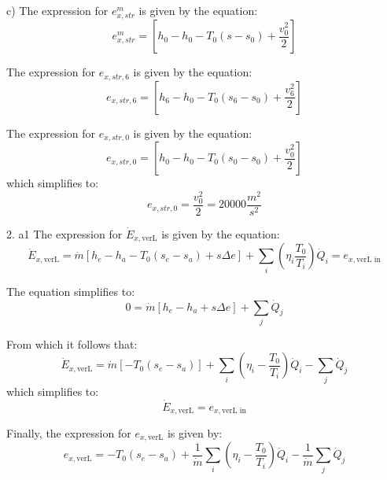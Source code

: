 c)
The expression for \( e_{x,str}^m \) is given by the equation:
\[ e_{x,str}^m = \left[ h_0 - h_0 - T_0 (s - s_0) + \frac{v_0^2}{2} \right] \]

The expression for \( e_{x,str,6} \) is given by the equation:
\[ e_{x,str,6} = \left[ h_6 - h_0 - T_0 (s_6 - s_0) + \frac{v_6^2}{2} \right] \]

The expression for \( e_{x,str,0} \) is given by the equation:
\[ e_{x,str,0} = \left[ h_0 - h_0 - T_0 (s_0 - s_0) + \frac{v_0^2}{2} \right] \]
which simplifies to:
\[ e_{x,str,0} = \frac{v_0^2}{2} = 20000 \frac{m^2}{s^2} \]

2. a1
The expression for \( \dot{E}_{x,\text{verL}} \) is given by the equation:
\[ \dot{E}_{x,\text{verL}} = \dot{m} \left[ h_e - h_a - T_0 (s_e - s_a) + s \Delta e \right] + \sum_i \left( \eta_i \frac{T_0}{T_i} \right) \dot{Q}_i = e_{x,\text{verL in}} \]

The equation simplifies to:
\[ 0 = \dot{m} \left[ h_e - h_a + s \Delta e \right] + \sum_j \dot{Q}_j \]

From which it follows that:
\[ \dot{E}_{x,\text{verL}} = \dot{m} \left[ - T_0 (s_e - s_a) \right] + \sum_i \left( \eta_i - \frac{T_0}{T_i} \right) \dot{Q}_i - \sum_j \dot{Q}_j \]
which simplifies to:
\[ \dot{E}_{x,\text{verL}} = e_{x,\text{verL in}} \]

Finally, the expression for \( e_{x,\text{verL}} \) is given by:
\[ e_{x,\text{verL}} = - T_0 (s_e - s_a) + \frac{1}{\dot{m}} \sum_i \left( \eta_i - \frac{T_0}{T_i} \right) \dot{Q}_i - \frac{1}{\dot{m}} \sum_j \dot{Q}_j \]